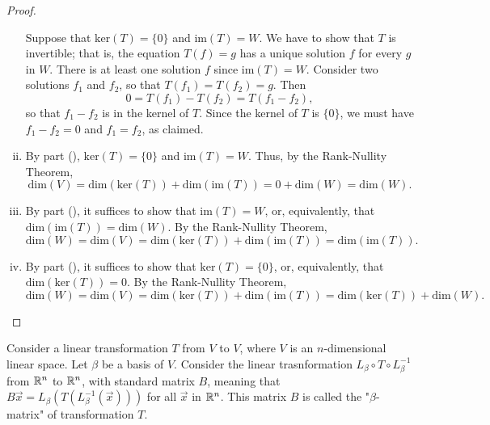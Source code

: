\documentclass[a4paper,11pt]{article}
\begin{document}
\begin{outline}
\begin{proof}
\begin{enumerate}[i.]
          \backward 
            Suppose that \(\text{ker}(T) = \{0\}\) and \(\text{im}(T)=W\). We have to show that \(T\) is 
            invertible; that is, the equation \(T(f) = g\) has a unique solution \(f\) for every \(g\) in \(W\). 
            There is at least one solution \(f\) since \(\text{im}(T) = W\). Consider two solutions \(f_1\) and 
            \(f_2\), so that \(T(f_1) = T(f_2) = g\). Then \[0 = T(f_1) - T(f_2) = T(f_1-f_2),\] so that 
            \(f_1-f_2\) is in the kernel of \(T\). Since the kernel of \(T\) is \(\{0\}\), we must have 
            \(f_1 - f_2 = 0\) and \(f_1=f_2\), as claimed.
          \item  
            By part (), \(\text{ker}(T) = \{0\}\) and \(\text{im}(T) = W\). Thus, by the 
            Rank-Nullity Theorem, \[\text{dim}(V) = \text{dim}(\text{ker}(T)) + \text{dim}(\text{im}(T)) =
            0 + \text{dim}(W) = \text{dim}(W)\text{.}\]
          \item
            By part (), it suffices to show that \(\text{im}(T)=W\), or, equivalently, that 
            \(\text{dim}(\text{im}(T)) = \text{dim}(W)\). By the Rank-Nullity Theorem, \[\text{dim}(W) = 
            \text{dim}(V) = \text{dim}(\text{ker}(T)) + \text{dim}(\text{im}(T)) = \text{dim}(\text{im}(T))\text{.}\]
          \item
            By part (), it suffices to show that \(\text{ker}(T) = \{0\}\), or, equivalently, 
            that \(\text{dim}(\text{ker}(T)) = 0\). By the Rank-Nullity Theorem, \[\text{dim}(W) = \text{dim}(V) 
            = \text{dim}(\text{ker}(T)) + \text{dim}(\text{im}(T)) = \text{dim}(\text{ker}(T)) + 
            \text{dim}(W)\text{.}\]
      \end{enumerate}
    \end{proof}
    
    
    
      Consider a linear transformation \(T\) from \(V\) to \(V\), where \(V\) is an \(n\)-dimensional linear space. 
      Let \(\beta\) be a basis of \(V\). Consider the linear trasnformation \(L_{\beta}\circ T\circ L_{\beta}^{-1}\)
     from \(\mathbb{R}^n\) to \(\mathbb{R}^n\), with standard matrix \(B\), meaning that \(B\vec{x} = 
     L_{\beta}(T(L_{\beta}^{-1}(\vec{x})))\) for all \(\vec{x}\) in \(\mathbb{R}^n\). This matrix \(B\) is called the 
     "\(\beta\)-matrix" of transformation \(T\).
    

\end{outline}
\end{document}
